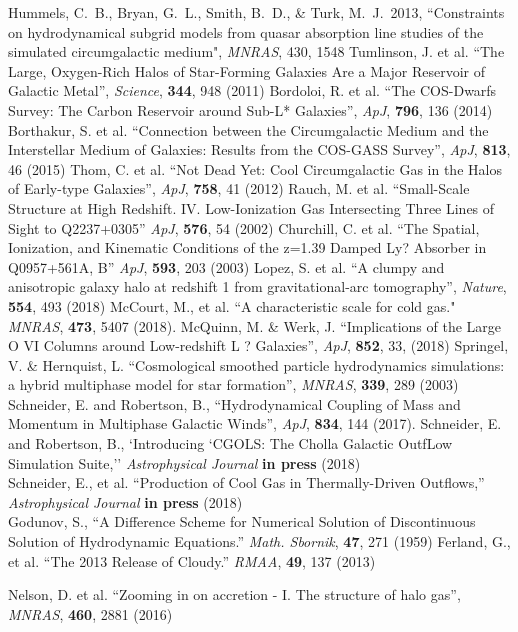 \documentclass[11pt,letterpaper,english]{article}
\begin{document}
{\begin{thebibliography}{500}
 Hummels, C.~B., Bryan, G.~L., Smith, B.~D., \& Turk, M.~J.\ 2013,  ``Constraints on hydrodynamical subgrid models from quasar absorption line studies of the simulated circumgalactic medium", {\em MNRAS}, 430, 1548 
 Tumlinson, J. et al. ``The Large, Oxygen-Rich Halos of Star-Forming Galaxies Are a Major Reservoir of Galactic Metal'', {\em Science}, {\bf 344}, 948 (2011)
 Bordoloi, R. et al. ``The COS-Dwarfs Survey: The Carbon Reservoir around Sub-L* Galaxies'', {\em ApJ}, {\bf 796}, 136 (2014)
 Borthakur, S. et al. ``Connection between the Circumgalactic Medium and the Interstellar Medium of Galaxies: Results from the COS-GASS Survey'', {\em ApJ}, {\bf 813}, 46 (2015)
 Thom, C. et al. ``Not Dead Yet: Cool Circumgalactic Gas in the Halos of Early-type Galaxies'', {\em ApJ}, {\bf 758}, 41 (2012)
 Rauch, M. et al.  ``Small-Scale Structure at High Redshift. IV. Low-Ionization Gas Intersecting Three Lines of Sight to Q2237+0305'' {\em ApJ}, {\bf 576}, 54 (2002)
 Churchill, C. et al. ``The Spatial, Ionization, and Kinematic Conditions of the z=1.39 Damped Ly? Absorber in Q0957+561A, B'' {\em ApJ}, {\bf 593}, 203 (2003)
 Lopez, S. et al. ``A clumpy and anisotropic galaxy halo at redshift 1 from gravitational-arc tomography'', {\em Nature}, {\bf 554}, 493 (2018) 
 McCourt, M., et al. ``A characteristic scale for cold gas." {\em MNRAS}, {\bf 473}, 5407 (2018).
 McQuinn, M. \& Werk, J. ``Implications of the Large O VI Columns around Low-redshift L ? Galaxies'', {\em ApJ}, {\bf 852}, 33, (2018)
 Springel, V. \& Hernquist, L. ``Cosmological smoothed particle hydrodynamics simulations: a hybrid multiphase model for star formation'', {\em MNRAS}, {\bf 339}, 289 (2003)
 Schneider, E. and Robertson, B., ``Hydrodynamical Coupling of Mass and Momentum in Multiphase Galactic Winds'', {\em ApJ}, {\bf 834}, 144 (2017).
 Schneider, E. and Robertson, B., `Introducing `CGOLS: The Cholla Galactic OutfLow Simulation Suite,'' {\em Astrophysical Journal}  {\bf in press} (2018) \\
 Schneider, E., et al. ``Production of Cool Gas in Thermally-Driven Outflows,'' {\em Astrophysical Journal} {\bf in press} (2018) \\
 Godunov, S., ``A Difference Scheme for Numerical Solution of Discontinuous Solution of Hydrodynamic Equations.'' {\em Math. Sbornik}, {\bf 47}, 271 (1959)
 Ferland, G., et al. ``The 2013 Release of Cloudy.'' {\em RMAA}, {\bf 49}, 137 (2013)



 Nelson, D. et al. ``Zooming in on accretion - I. The structure of halo gas'', {\em MNRAS}, {\bf 460}, 2881 (2016)
\vspace{-.09in}
\end{thebibliography}
}
\end{document}
